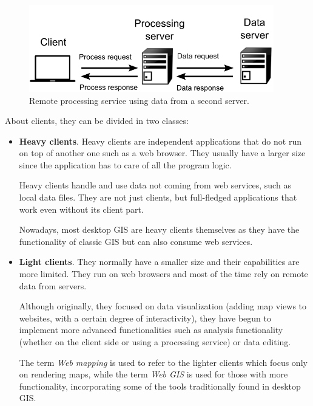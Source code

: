 \begin{itemize}
\begin{figure}[!hbt]   
\centering
\includegraphics[width=0.95\textwidth]{Software/Remote_data_and_services.png}
\caption{\small Remote processing service using data from a second server.}
\label{Fig:Remote_data_and_services} 
\end{figure}

\end{itemize}

About clients, they can be divided in two classes:

\begin{itemize}

	\item \textbf{Heavy clients}. Heavy clients are independent applications that do not run on top of another one such as a web browser. They usually have a larger size since the application has to care of all the program logic.

	Heavy clients handle and use data not coming from web services, such as local data files. They are not just clients, but full-fledged applications that work even without its client part.

	Nowadays, most desktop GIS are heavy clients themselves as they have the functionality of classic GIS but can also consume web services.


	\item \textbf{Light clients}. They normally have a smaller size and their capabilities are more limited. They run on web browsers and most of the time rely on remote data from servers.

	Although originally, they focused on data visualization (adding map views to websites, with a certain degree of interactivity), they have begun to implement more advanced functionalities such as analysis functionality (whether on the client side or using a processing service) or data editing.

	The term \emph{Web mapping} is used to refer to the lighter clients which focus only on rendering maps, while the term \emph{Web GIS} is used for those with more functionality, incorporating some of the tools traditionally found in desktop GIS.
\end{itemize}

